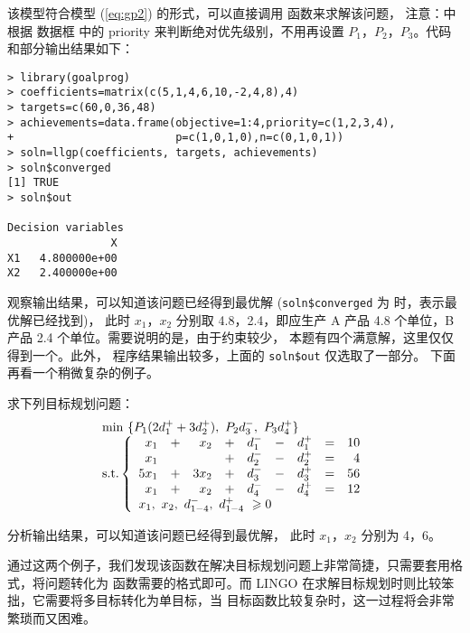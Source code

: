 该模型符合模型 (\ref{eq:gp2}) 的形式，可以直接调用  函数来求解该问题，
注意：\R 中根据  数据框
中的 priority 来判断绝对优先级别，不用再设置 $P_1$，$P_2$，$P_3$。\R 代码和部分输出结果如下：
\begin{Verbatim}
> library(goalprog)
> coefficients=matrix(c(5,1,4,6,10,-2,4,8),4)
> targets=c(60,0,36,48)
> achievements=data.frame(objective=1:4,priority=c(1,2,3,4),
+                         p=c(1,0,1,0),n=c(0,1,0,1))
> soln=llgp(coefficients, targets, achievements)
> soln$converged
[1] TRUE
> soln$out

Decision variables
                X
X1   4.800000e+00
X2   2.400000e+00
\end{Verbatim}

观察输出结果，可以知道该问题已经得到最优解 (\verb|soln$converged| 为  时，表示最优解已经找到)，
此时 $x_1$，$x_2$ 分别取 4.8，2.4，即应生产 A 产品 4.8 个单位，B 产品 2.4 个单位。需要说明的是，由于约束较少，
本题有四个满意解，这里仅仅得到一个。此外，
程序结果输出较多，上面的 \verb|soln$out| 仅选取了一部分。
下面再看一个稍微复杂的例子。
\begin{exmp}
求下列目标规划问题：
 \begin{equation*}
\begin{array}{l}
 \min \ \{P_1(2d_1^+ + 3d_2^+),\ P_2d_3^-,\  P_3d_4^+\}\\
 \text{s.t.}\left\{ \begin{array}{rrrrrrrrr}
 x_1&+ & x_2 &+ &d_1^{-} &-& d_1^{+}&=& 10\\
 x_1&  &     &+ &d_2^{-} &-& d_2^{+}&=& 4\\
 5x_1&+& 3x_2&+ &d_3^{-} &-& d_3^{+}&=& 56\\
 x_1&+ & x_2 &+ &d_4^{-} &-& d_4^{+}&=&12\\
 \multicolumn{9}{l}{x_1, \ x_2,\  d_{1-4}^-, \ d_{1-4}^{+}\ \geqslant 0}
 \end{array} \right.
 \end{array}
\end{equation*}
\end{exmp}


分析输出结果，可以知道该问题已经得到最优解，
此时 $x_1$，$x_2$ 分别为 4，6。


通过这两个例子，我们发现该函数在解决目标规划问题上非常简捷，只需要套用格式，将问题转化为
函数需要的格式即可。而 LINGO 在求解目标规划时则比较笨拙，它需要将多目标转化为单目标，当
目标函数比较复杂时，这一过程将会非常繁琐而又困难。
